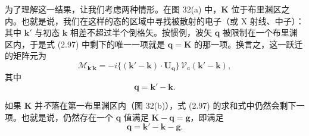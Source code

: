 为了理解这一结果，让我们考虑两种情形。在图 32(a) 中，$\mathbf{K}$
位于布里渊区之内。也就是说，我们在这样的态的区域中寻找被散射的电子（或 X
射线、中子）：其中 $\mathbf{k}'$ 与初态 $\mathbf{k}$ 相差不超过半个倒格矢。按惯例，波矢
$\mathbf{q}$ 被限制在一个布里渊区内，于是式 (2.97)
中剩下的唯一一项就是 $\mathbf{q} = \mathbf{K}$ 的那一项。换言之，这一跃迁的矩阵元为
\begin{equation*}
\mathcal{M}_{\mathbf{k}'\mathbf{k}} = -i\{(\mathbf{k}'-\mathbf{k})\cdot
\mathbf{U}_{\mathbf{q}}\}\, \mathcal{V}_a(\mathbf{k}'-\mathbf{k}),
\tag{2.98}
\end{equation*}
其中
\begin{equation*}
\mathbf{q} = \mathbf{k}' - \mathbf{k}.
\tag{2.99}
\end{equation*}


如果 $\mathbf{K}$ 并\emph{不}落在第一布里渊区内（图 32(b)），式 (2.97)
的求和式中仍然会剩下一项。也就是说，仍然存在一个 $\mathbf{q}$
值满足 $\mathbf{K} - \mathbf{q} = \mathbf{g}$，即满足
\begin{equation*}
\mathbf{q} = \mathbf{k}' - \mathbf{k} - \mathbf{g}.
\tag{2.100}
\end{equation*}
